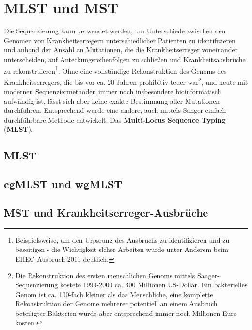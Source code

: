 \section{MLST und MST}

Die Sequenzierung kann verwendet werden, um Unterschiede zwischen den Genomen von Krankheitserregern unterschiedlicher Patienten zu identifizieren und anhand der Anzahl an Mutationen, die die Krankheitserreger voneinander unterscheiden, auf Anteckungsreihenfolgen zu schließen und Krankheitsausbrüche zu rekonstruieren\footnote{Beispielsweise, um den Urpsrung des Ausbruchs zu identifizieren und zu beseitigen - die Wichtigkeit slcher Arbeiten wurde unter Anderem beim EHEC-Ausbruch 2011 deutlich.}. Ohne eine vollständige Rekonstruktion des Genoms des Krankheitserregers, die bis vor ca. 20 Jahren prohibitiv teuer war\footnote{Die Rekonstruktion des ersten menschlichen Genoms mittels Sanger-Sequenzierung kostete 1999-2000 ca. 300 Millionen US-Dollar. Ein bakterielles Genom ist ca. 100-fach kleiner als das Menschliche, eine komplette Rekonstruktion der Genome mehrerer potentiell an einem Ausbruch beteiligter Bakterien würde aber entsprechend immer noch Millionen Euro kosten.}, und heute mit modernen Sequenziermethoden immer noch insbesondere bioinformatisch aufwändig ist, lässt sich aber keine exakte Bestimmung aller Mutationen durchführen. Entsprechend wurde eine andere, auch mittels Sanger einfach durchführbare Methode entwickelt: Das \textbf{Multi-Locus Sequence Typing} (\textbf{MLST}).

\subsection{MLST}

\subsection{cgMLST und wgMLST}

\subsection{MST und Krankheitserreger-Ausbrüche}
